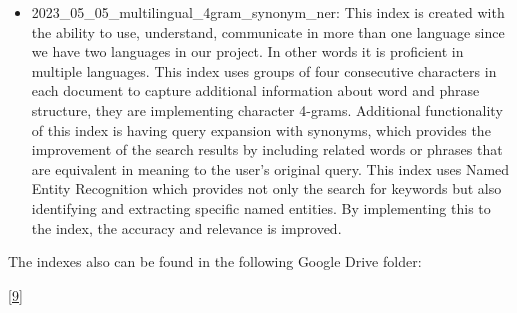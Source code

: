 \begin{itemize}
	\item 2023\_05\_05\_multilingual\_4gram\_synonym\_ner: This index is created with the ability to use, understand, communicate in more than one language since we have two languages in our project. In other words it is proficient in multiple languages. This index uses groups of four consecutive characters in each document to capture additional information about word and phrase structure, they are implementing character 4-grams. Additional functionality of this index is having query expansion with synonyms, which provides the improvement of the search results by including related words or phrases that are equivalent in meaning to the user's original query. This index uses Named Entity Recognition which provides not only the search for keywords but also identifying and extracting specific named entities. By implementing this to the index, the accuracy and relevance is improved.
\end{itemize}
The indexes also can be found in the following Google Drive folder: 

\href{https://drive.google.com/drive/folders/1CK_kLeZ5Us3VJe8hiG1vhwPrDs94cLvU?usp=share_link}{[9]}